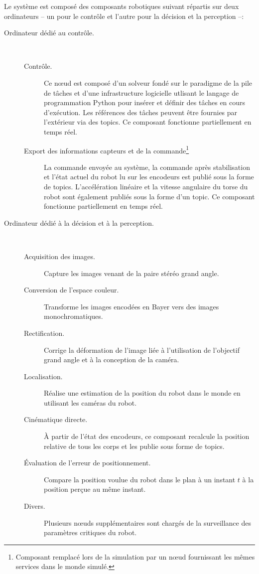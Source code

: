 Le système est composé des composants robotiques suivant répartis sur
deux ordinateurs -- un pour le contrôle et l'autre pour la décision et
la perception --:
\begin{description}
\item[Ordinateur dédié au contrôle.]
   \\
  \begin{description}
  \item[Contrôle.] Ce n\oe ud est composé d'un solveur fondé sur le
    paradigme de la pile de tâches et d'une infrastructure logicielle
    utlisant le langage de programmation Python pour insérer et
    définir des tâches en cours d'exécution. Les références des tâches
    peuvent être fournies par l'extérieur via des topics. Ce composant
    fonctionne partiellement en temps réel.
  \item[Export des informations capteurs et de la
    commande\footnote{Composant remplacé lors de la simulation par un
      n\oe ud fournissant les mêmes services dans le monde
      simulé.}\addtocounter{footnote}{-1}\addtocounter{Hfootnote}{-1}.]
    La commande envoyée au système, la commande après stabilisation et
    l'état actuel du robot lu sur les encodeurs est publié sous la
    forme de topics. L'accélération linéaire et la vitesse angulaire
    du torse du robot sont également publiés sous la forme d'un
    topic. Ce composant fonctionne partiellement en temps réel.
  \end{description}

\item[Ordinateur dédié à la décision et à la perception.]
   \\
  \begin{description}
  \item[Acquisition des images.\footnotemark] Capture les images venant de la paire
    stéréo grand angle.
  \item[Conversion de l'espace couleur.] Transforme les images encodées
    en Bayer vers des images monochromatiques.
  \item[Rectification.] Corrige la déformation de l'image liée à
    l'utilisation de l'objectif grand angle et à la conception de la
    caméra.
  \item[Localisation.] Réalise une estimation de la position du robot
    dans le monde en utilisant les caméras du robot.
  \item[Cinématique directe.] À partir de l'état des encodeurs, ce
    composant recalcule la position relative de tous les corps et les
    publie sous forme de topics.
  \item[Évaluation de l'erreur de positionnement.] Compare la position
    voulue du robot dans le plan à un instant $t$ à la position perçue
    au même instant.
  \item[Divers.] Plusieurs n\oe uds supplémentaires sont chargés de la
    surveillance des paramètres critiques du robot.
  \end{description}
\end{description}


